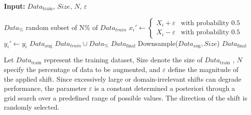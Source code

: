 \begin{algorithm}[H]
    \vspace{0.6em}
    \textbf{Input:} $Data_{\text{train}}$, $Size$, $N$, $\varepsilon$
    \vspace{0.6em}
    \begin{algorithmic}[1]
        \State $Data_{\%}$ \leftarrow random subset of N\% of $Data_{train}$
            \vspace{0.6em}
            \State $x_i' \leftarrow 
            \begin{cases}
                X_i + \varepsilon & \text{with probability } 0.5 \\
                X_i - \varepsilon & \text{with probability } 0.5
            \end{cases}$
            \State $y_i' \leftarrow y_i$
            \vspace{0.6em}
        \EndFor
        \vspace{0.6em}
        \State $Data_\text{aug}$ \leftarrow $Data_{train} \cup Data_{\%}$
        \State $Data_\text{final}$ \leftarrow Downsample($Data_\text{aug}, Size$)
        \vspace{0.6em}
        \State \Return $Data_{\text{final}}$
    \end{algorithmic}
    \caption{Let $Data_{\text{train}}$ represent the training dataset, $\text{Size}$ denote the size of $Data_{\text{train}}$ , $N$ specify the percentage of data to be augmented, and $\varepsilon$ define the magnitude of the applied shift. Since excessively large or domain-irrelevant shifts can degrade performance, the parameter $\varepsilon$ is a constant determined a posteriori through a grid search over a predefined range of possible values. The direction of the shift is randomly selected.}
\end{algorithm}



